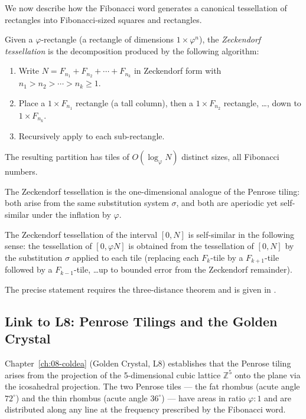 We now describe how the Fibonacci word generates a canonical
tessellation of rectangles into Fibonacci-sized squares and rectangles.

\begin{definition}%
  \label{def:zeckendorf-rect}
  Given a \(\varphi\)-rectangle (a rectangle of dimensions
  \(1\times\varphi^n\)), the \emph{Zeckendorf tessellation} is the
  decomposition produced by the following algorithm:
  \begin{enumerate}
    \item Write \(N = F_{n_1}+F_{n_2}+\cdots+F_{n_k}\) in Zeckendorf
      form with \(n_1>n_2>\cdots>n_k\geq 1\).
    \item Place a \(1\times F_{n_1}\) rectangle (a tall column), then
      a \(1\times F_{n_2}\) rectangle, \ldots, down to
      \(1\times F_{n_k}\).
    \item Recursively apply to each sub-rectangle.
  \end{enumerate}
  The resulting partition has tiles of \(O(\log_\varphi N)\) distinct
  sizes, all Fibonacci numbers.
\end{definition}

The Zeckendorf tessellation is the one-dimensional analogue of the
Penrose tiling: both arise from the same substitution system
\(\sigma\), and both are aperiodic yet self-similar under the
inflation by \(\varphi\).

\begin{proposition}%
  \label{prop:zeckendorf-selfsim}
  The Zeckendorf tessellation of the interval \([0,N]\) is
  self-similar in the following sense: the tessellation of
  \([0,\varphi N]\) is obtained from the tessellation of \([0,N]\)
  by the substitution \(\sigma\) applied to each tile (replacing
  each \(F_k\)-tile by a \(F_{k+1}\)-tile followed by a
  \(F_{k-1}\)-tile, \ldots up to bounded error from the Zeckendorf
  remainder).
\end{proposition}

The precise statement requires the three-distance theorem and is
given in \cite[Ch.~7]{pytheasfogg2002substitutions}.

\subsection{Link to L8: Penrose Tilings and the Golden Crystal}
\label{subsec:ch19-penrose-link}

Chapter~\ref{ch:08-coldea} (Golden Crystal, L8) establishes that the
Penrose tiling arises from the projection of the 5-dimensional cubic
lattice \(\mathbb{Z}^5\) onto the plane via the icosahedral
projection.  The two Penrose tiles --- the fat rhombus (acute angle
\(72^\circ\)) and the thin rhombus (acute angle \(36^\circ\)) --- have
areas in ratio \(\varphi:1\) and are distributed along any line at
the frequency prescribed by the Fibonacci word.

